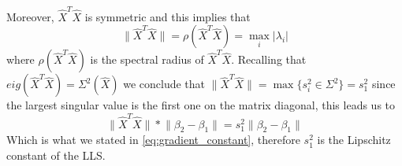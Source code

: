 \noindent Moreover, $\hat{X}^T \hat{X}$ is symmetric and this implies that
\begin{equation}
    \lVert \hat{X}^T \hat{X} \rVert = \rho(\hat{X}^T\hat{X}) = \max_i |\lambda_i|
\end{equation}
where $\rho(\hat{X}^T\hat{X})$ is the spectral radius of $\hat{X}^T\hat{X}$. Recalling that $eig(\hat{X}^T \hat{X}) = \Sigma^2(\hat{X})$ we conclude that $\lVert \hat{X}^T \hat{X} \rVert = \max \{s_i^2 \in \Sigma^2\} = s_1^2$ since the largest singular value is the first one on the matrix diagonal, this leads us to
\begin{equation}
    \lVert \hat{X}^T \hat{X} \rVert * \lVert \beta_2 - \beta_1 \rVert = s_{1}^2 \lVert \beta_2 - \beta_1 \rVert
\end{equation}
Which is what we stated in \eqref{eq:gradient_constant}, therefore $s_{1}^2$ is the Lipschitz constant of the LLS.
